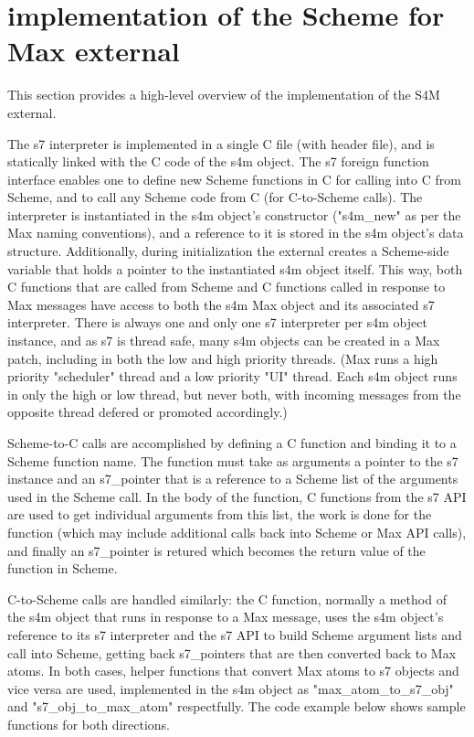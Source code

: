 \documentclass[acmsmall]{acmart}
\begin{document}
\section{implementation of the Scheme for Max external}

This section provides a high-level overview of the implementation of the S4M external.

The s7 interpreter is implemented in a single C file (with header file), 
and is statically linked with the C code of the s4m object. 
The s7 foreign function interface enables one to define new Scheme functions in C 
for calling into C from Scheme, and to call any Scheme code from C (for C-to-Scheme calls). 
The interpreter is instantiated
in the s4m object's constructor ("s4m_new" as per the Max naming conventions), and
a reference to it is stored in the s4m object's data structure.
Additionally, during initialization the external creates a Scheme-side variable 
that holds a pointer to the instantiated s4m object itself. This way,
both C functions that are called from Scheme and C functions called in response to Max
messages have access to both the s4m Max object and its associated s7 interpreter.
There is always one and only one s7 interpreter per s4m object instance, and
as s7 is thread safe, many s4m objects can be created in a Max patch, including
in both the low and high priority threads. (Max runs a high priority "scheduler" 
thread and a low priority "UI" thread. Each s4m object runs in only
the high or low thread, but never both, with incoming messages from the opposite
thread defered or promoted accordingly.)

Scheme-to-C calls are accomplished by defining a C function and binding
it to a Scheme function name. The function must take as arguments
a pointer to the s7 instance and an s7\_pointer
that is a reference to a Scheme list of the arguments used in the Scheme call.
In the body of the function, C functions from the s7 API are used to get 
individual arguments from this list, the work is done for the function 
(which may include additional calls back into Scheme or Max API calls),
and finally an s7\_pointer is retured which becomes the return value of the 
function in Scheme.

C-to-Scheme calls are handled similarly: the C function, normally a method
of the s4m object that runs in response to a Max message, uses the
s4m object's reference to its s7 interpreter and the s7 API to build
Scheme argument lists and call into Scheme, getting back s7\_pointers that
are then converted back to Max atoms. In both cases, helper
functions that convert Max atoms to s7 objects and vice versa are used, 
implemented in the s4m object as "max_atom_to_s7_obj" and "s7_obj_to_max_atom"
respectfully. The code example below shows sample functions for both directions.
\end{document}
